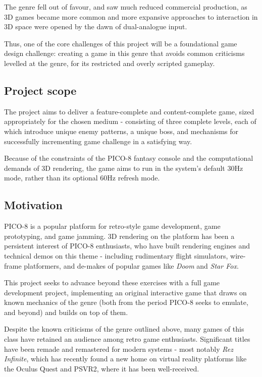 \documentclass{article}
\begin{document}
The genre fell out of favour, and saw much reduced commercial production, as 3D games became more
common and more expansive approaches to interaction in 3D space were opened by the dawn of
dual-analogue input.

Thus, one of the core challenges of this project will be a foundational game design challenge:
creating a game in this genre that avoids common criticisms levelled at the genre, for its
restricted and overly scripted gameplay.

\subsection*{Project scope}
The project aims to deliver a feature-complete and content-complete game,
sized appropriately for the chosen medium - consisting of three complete
levels, each of which introduce unique enemy patterns, a unique boss, and
mechanisms for successfully incrementing game challenge in a satisfying way.

Because of the constraints of the PICO-8 fantasy console and the computational
demands of 3D rendering, the game aims to run in the system's default 30Hz mode,
rather than its optional 60Hz refresh mode.

\subsection*{Motivation}
PICO-8 is a popular platform for retro-style game development, game prototyping, and game jamming.
3D rendering on the platform has been a persistent interest of PICO-8 enthusiasts, who have built
rendering engines and technical demos on this theme - including rudimentary flight simulators,
wire-frame platformers, and de-makes of popular games like \textit{Doom} and \textit{Star Fox}.

This project seeks to advance beyond these exercises with a full game development project, implementing
an original interactive game that draws on known mechanics of the genre (both from the period PICO-8 seeks
to emulate, and beyond) and builds on top of them.

Despite the known criticisms of the genre outlined above, many games of this
class have retained an audience among retro game enthusiasts. Significant titles have been
remade and remastered for modern systems - most notably \textit{Rez Infinite}, which has
recently found a new home on virtual reality platforms like the Oculus Quest and PSVR2,
where it has been well-received.
\end{document}
